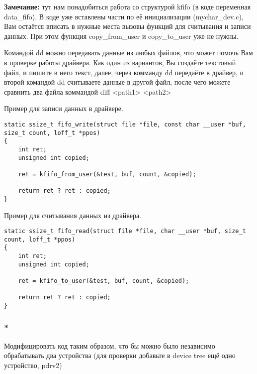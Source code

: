 \textbf{Замечание:} тут нам понадобиться работа со структурой kfifo (в коде переменная data\_fifo). В коде уже вставлены части по её инициализации (mychar\_dev.c), Вам остаётся вписать в нужные места вызовы функций для считывания и записи данных. При этом функция copy\_from\_user и copy\_to\_user уже не нужны.

Командой dd можно передавать данные из любых файлов, что может помочь Вам в проверке работы драйвера. Как один из вариантов, Вы создаёте текстовый файл, и пишите в него текст, далее, через комманду dd передаёте в драйвер, и второй командой dd считываете данные в другой файл, после чего можете сравнить два файла коммандой diff <path1> <path2>

Пример для записи данных в драйвере.
\begin{lstlisting}[style=stdout]
static ssize_t fifo_write(struct file *file, const char __user *buf, size_t count, loff_t *ppos)
{
	int ret;
	unsigned int copied;
	
	ret = kfifo_from_user(&test, buf, count, &copied);
	
	return ret ? ret : copied;
}
\end{lstlisting}


Пример для считывания данных из драйвера.
\begin{lstlisting}[style=stdout]
static ssize_t fifo_read(struct file *file, char __user *buf, size_t count, loff_t *ppos)
{
	int ret;
	unsigned int copied;
	
	ret = kfifo_to_user(&test, buf, count, &copied);
	
	return ret ? ret : copied;
}
\end{lstlisting}

\subsubsection{*} Модифицировать код таким образом, что бы  можно было независимо обрабатывать два устройства (для проверки добавьте в device tree ещё одно устройство, pdrv2)
